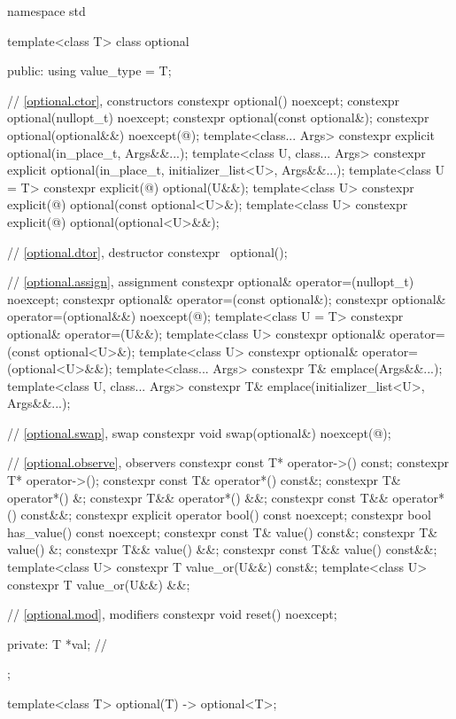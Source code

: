 %
%
\begin{codeblock}
namespace std {
  template<class T>
  class optional {
  public:
    using value_type = T;

    // \ref{optional.ctor}, constructors
    constexpr optional() noexcept;
    constexpr optional(nullopt_t) noexcept;
    constexpr optional(const optional&);
    constexpr optional(optional&&) noexcept(@\seebelow@);
    template<class... Args>
      constexpr explicit optional(in_place_t, Args&&...);
    template<class U, class... Args>
      constexpr explicit optional(in_place_t, initializer_list<U>, Args&&...);
    template<class U = T>
      constexpr explicit(@\seebelow@) optional(U&&);
    template<class U>
      constexpr explicit(@\seebelow@) optional(const optional<U>&);
    template<class U>
      constexpr explicit(@\seebelow@) optional(optional<U>&&);

    // \ref{optional.dtor}, destructor
    constexpr ~optional();

    // \ref{optional.assign}, assignment
    constexpr optional& operator=(nullopt_t) noexcept;
    constexpr optional& operator=(const optional&);
    constexpr optional& operator=(optional&&) noexcept(@\seebelow@);
    template<class U = T> constexpr optional& operator=(U&&);
    template<class U> constexpr optional& operator=(const optional<U>&);
    template<class U> constexpr optional& operator=(optional<U>&&);
    template<class... Args> constexpr T& emplace(Args&&...);
    template<class U, class... Args> constexpr T& emplace(initializer_list<U>, Args&&...);

    // \ref{optional.swap}, swap
    constexpr void swap(optional&) noexcept(@\seebelow@);

    // \ref{optional.observe}, observers
    constexpr const T* operator->() const;
    constexpr T* operator->();
    constexpr const T& operator*() const&;
    constexpr T& operator*() &;
    constexpr T&& operator*() &&;
    constexpr const T&& operator*() const&&;
    constexpr explicit operator bool() const noexcept;
    constexpr bool has_value() const noexcept;
    constexpr const T& value() const&;
    constexpr T& value() &;
    constexpr T&& value() &&;
    constexpr const T&& value() const&&;
    template<class U> constexpr T value_or(U&&) const&;
    template<class U> constexpr T value_or(U&&) &&;

    // \ref{optional.mod}, modifiers
    constexpr void reset() noexcept;

  private:
    T *val;         // \expos
  };

  template<class T>
    optional(T) -> optional<T>;
}
\end{codeblock}

